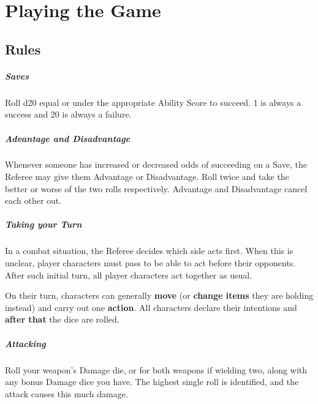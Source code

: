 \documentclass[itdr]{subfiles}
\begin{document}
\cleartoleftpage

\chapter{Playing the Game}
\label{ch:playing_the_game}

\section{Rules}

\paragraph{Saves}
Roll d20 equal or under the appropriate Ability Score to succeed. 1 is always a success and 20 is \mbox{always} a failure.

\vfill

\paragraph{Advantage and Disadvantage}
Whenever someone has increased or decreased odds of succeeding on a Save, the Referee may give them Advantage or Disadvantage. Roll twice and take the better or worse of the two rolls respectively. Advantage and Disadvantage cancel each other out.

\vfill

\paragraph{Taking your Turn}
In a combat situation, the Referee decides which side acts first. When this is unclear, player characters must pass  to be able to act before their opponents. After such initial turn, all player characters act together as usual.

On their turn, characters can generally \textbf{move} (or \textbf{change items} they are holding instead) and carry out one \textbf{action}. All characters declare their \mbox{intentions} and \textbf{after that} the dice are rolled.

\vfill

\paragraph{Attacking}
Roll your weapon's Damage die, or for both weapons if wielding two, along with any bonus Damage dice you have. The highest single roll is identified, and the attack causes this much damage.
\end{document}

